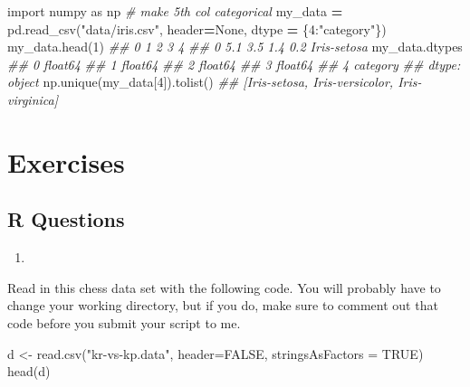 \documentclass[
  12pt,
  krantz2]{krantz}
\makeatletter
\newenvironment{Shaded}{\begin{snugshade}}{\end{snugshade}}
\newcommand{\AttributeTok}[1]{\textcolor[rgb]{0.61,0.61,0.61}{#1}}
\newcommand{\CommentTok}[1]{\textcolor[rgb]{0.37,0.37,0.37}{\textit{#1}}}
\newcommand{\ConstantTok}[1]{\textcolor[rgb]{0,0,0}{#1}}
\newcommand{\DecValTok}[1]{\textcolor[rgb]{0.06,0.06,0.06}{#1}}
\newcommand{\FunctionTok}[1]{\textcolor[rgb]{0,0,0}{#1}}
\newcommand{\ImportTok}[1]{#1}
\newcommand{\NormalTok}[1]{#1}
\newcommand{\OperatorTok}[1]{\textcolor[rgb]{0.43,0.43,0.43}{\textbf{#1}}}
\newcommand{\OtherTok}[1]{\textcolor[rgb]{0.37,0.37,0.37}{#1}}
\newcommand{\StringTok}[1]{\textcolor[rgb]{0.5,0.5,0.5}{#1}}
\newcommand{\VariableTok}[1]{\textcolor[rgb]{0,0,0}{#1}}
\providecommand{\tightlist}{%
  \setlength{\itemsep}{0pt}\setlength{\parskip}{0pt}}
\newenvironment{kframe}{%
\medskip{}
\setlength{\fboxsep}{.8em}
 \def\at@end@of@kframe{}%
 \ifinner\ifhmode%
  \def\at@end@of@kframe{\end{minipage}}%
  \begin{minipage}{\columnwidth}%
 \fi\fi%
 \def\FrameCommand##1{\hskip\@totalleftmargin \hskip-\fboxsep
 \colorbox{shadecolor}{##1}\hskip-\fboxsep
     \hskip-\linewidth \hskip-\@totalleftmargin \hskip\columnwidth}%
 \MakeFramed {\advance\hsize-\width
   \@totalleftmargin\z@ \linewidth\hsize
   \@setminipage}}%
 {\par\unskip\endMakeFramed%
 \at@end@of@kframe}
\renewenvironment{Shaded}{\begin{kframe}}{\end{kframe}}
\makeatother
\begin{document}
\begin{Shaded}
\begin{Highlighting}[]
\ImportTok{import}\NormalTok{ numpy }\ImportTok{as}\NormalTok{ np}
\CommentTok{\# make 5th col categorical}
\NormalTok{my\_data }\OperatorTok{=}\NormalTok{ pd.read\_csv(}\StringTok{"data/iris.csv"}\NormalTok{, header}\OperatorTok{=}\VariableTok{None}\NormalTok{, }
\NormalTok{                      dtype }\OperatorTok{=}\NormalTok{ \{}\DecValTok{4}\NormalTok{:}\StringTok{"category"}\NormalTok{\}) }
\NormalTok{my\_data.head(}\DecValTok{1}\NormalTok{)}
\CommentTok{\#\#      0    1    2    3            4}
\CommentTok{\#\# 0  5.1  3.5  1.4  0.2  Iris{-}setosa}
\NormalTok{my\_data.dtypes}
\CommentTok{\#\# 0     float64}
\CommentTok{\#\# 1     float64}
\CommentTok{\#\# 2     float64}
\CommentTok{\#\# 3     float64}
\CommentTok{\#\# 4    category}
\CommentTok{\#\# dtype: object}
\NormalTok{np.unique(my\_data[}\DecValTok{4}\NormalTok{]).tolist()}
\CommentTok{\#\# [\textquotesingle{}Iris{-}setosa\textquotesingle{}, \textquotesingle{}Iris{-}versicolor\textquotesingle{}, \textquotesingle{}Iris{-}virginica\textquotesingle{}]}
\end{Highlighting}
\end{Shaded}

\hypertarget{exercises-5}{%
\section{Exercises}\label{exercises-5}}

\hypertarget{r-questions-5}{%
\subsection{R Questions}\label{r-questions-5}}

\begin{enumerate}
\def\labelenumi{\arabic{enumi}.}
\tightlist
\item
\end{enumerate}

Read in this chess data set \citep{misc_chess} with the following code. You will probably have to change your working directory, but if you do, make sure to comment out that code before you submit your script to me.

\begin{Shaded}
\begin{Highlighting}[]
\NormalTok{d }\OtherTok{\textless{}{-}} \FunctionTok{read.csv}\NormalTok{(}\StringTok{"kr{-}vs{-}kp.data"}\NormalTok{, }\AttributeTok{header=}\ConstantTok{FALSE}\NormalTok{, }\AttributeTok{stringsAsFactors =} \ConstantTok{TRUE}\NormalTok{)}
\FunctionTok{head}\NormalTok{(d)}
\end{Highlighting}
\end{Shaded}
\end{document}
